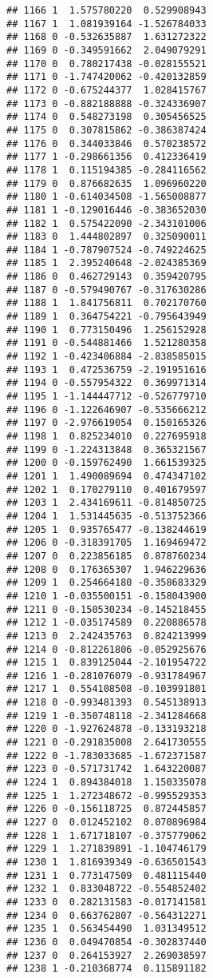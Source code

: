 \documentclass[
]{article}
\begin{document}
\begin{verbatim}
## 1166 1  1.575780220  0.529908943
## 1167 1  1.081939164 -1.526784033
## 1168 0 -0.532635887  1.631272322
## 1169 0 -0.349591662  2.049079291
## 1170 0  0.780217438 -0.028155521
## 1171 0 -1.747420062 -0.420132859
## 1172 0 -0.675244377  1.028415767
## 1173 0 -0.882188888 -0.324336907
## 1174 0  0.548273198  0.305456525
## 1175 0  0.307815862 -0.386387424
## 1176 0  0.344033846  0.570238572
## 1177 1 -0.298661356  0.412336419
## 1178 1  0.115194385 -0.284116562
## 1179 0  0.876682635  1.096960220
## 1180 1 -0.614034508 -1.565008877
## 1181 1 -0.129016446 -0.383652030
## 1182 1  0.575422090 -2.343101006
## 1183 0  1.444802897  0.325090011
## 1184 1 -0.787907524 -0.749224625
## 1185 1  2.395240648 -2.024385369
## 1186 0  0.462729143  0.359420795
## 1187 0 -0.579490767 -0.317630286
## 1188 1  1.841756811  0.702170760
## 1189 1  0.364754221 -0.795643949
## 1190 1  0.773150496  1.256152928
## 1191 0 -0.544881466  1.521280358
## 1192 1 -0.423406884 -2.838585015
## 1193 1  0.472536759 -2.191951616
## 1194 0 -0.557954322  0.369971314
## 1195 1 -1.144447712 -0.526779710
## 1196 0 -1.122646907 -0.535666212
## 1197 0 -2.976619054  0.150165326
## 1198 1  0.825234010  0.227695918
## 1199 0 -1.224313848  0.365321567
## 1200 0 -0.159762490  1.661539325
## 1201 1  1.490089694  0.474347102
## 1202 1  0.170279110  0.401679597
## 1203 1  2.434169611 -0.814850725
## 1204 1  1.531445635 -0.513752366
## 1205 1  0.935765477 -0.138244619
## 1206 0 -0.318391705  1.169469472
## 1207 0  0.223856185  0.878760234
## 1208 0  0.176365307  1.946229636
## 1209 1  0.254664180 -0.358683329
## 1210 1 -0.035500151 -0.158043900
## 1211 0 -0.150530234 -0.145218455
## 1212 1 -0.035174589  0.220886578
## 1213 0  2.242435763  0.824213999
## 1214 0 -0.812261806 -0.052925676
## 1215 1  0.839125044 -2.101954722
## 1216 1 -0.281076079 -0.931784967
## 1217 1  0.554108508 -0.103991801
## 1218 0 -0.993481393  0.545138913
## 1219 1 -0.350748118 -2.341284668
## 1220 0 -1.927624878 -0.133193218
## 1221 0 -0.291835008  2.641730555
## 1222 0 -1.783033685 -1.672371587
## 1223 0 -0.571731742  1.643220087
## 1224 1  0.894384018  1.150335078
## 1225 1  1.272348672 -0.995529353
## 1226 0 -0.156118725  0.872445857
## 1227 0  0.012452102  0.070896984
## 1228 1  1.671718107 -0.375779062
## 1229 1  1.271839891 -1.104746179
## 1230 1  1.816939349 -0.636501543
## 1231 1  0.773147509  0.481115440
## 1232 1  0.833048722 -0.554852402
## 1233 0  0.282131583 -0.017141581
## 1234 0  0.663762807 -0.564312271
## 1235 1  0.563454490  1.031349512
## 1236 0  0.049470854 -0.302837440
## 1237 0  0.264153927  2.269038597
## 1238 1 -0.210368774  0.115891182

\end{verbatim}
\end{document}
